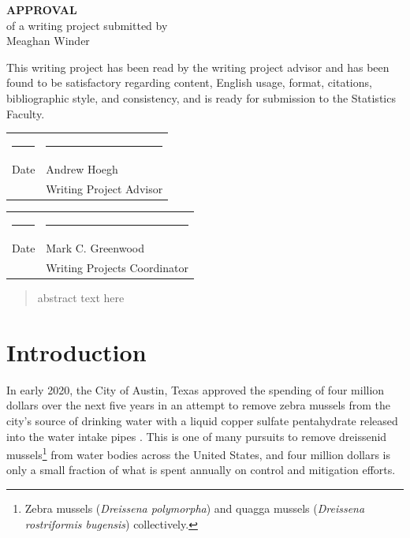 \documentclass[12pt]{article}\usepackage[]{graphicx}\usepackage[]{color}
\begin{document}
\begin{titlepage}
\null
\begin{center}
{\bf\huge APPROVAL}\\[1.0 in]
of a writing project submitted by\\[.25 in]
Meaghan Winder \\[0.5 in]
\end{center}

\noindent
This writing project has been read by the writing project advisor and
has been found to be satisfactory regarding content, English usage,
format, citations, bibliographic style, and consistency, and is ready
for submission to the Statistics Faculty.

\vspace{.3in}
\begin{center}
\begin{tabular}{ll}
\rule{2.75in}{.03in} & \rule{2.75in}{.03in} \\
Date& Andrew Hoegh \\
& Writing Project Advisor \\
\end{tabular}
\end{center}

\vspace{1cm}

\begin{center}
\begin{tabular}{ll}
\rule{2.75in}{.03in} & \rule{2.75in}{.03in} \\
Date& Mark C. Greenwood \\
& Writing Projects Coordinator \\
\end{tabular}
\end{center}

\end{titlepage}

\newpage
\tableofcontents
\newpage

\begin{abstract}
\noindent abstract text here 
\end{abstract}

\doublespacing

\section{Introduction}

In early 2020, the City of Austin, Texas approved the spending of four million dollars over the next five years in an attempt to remove zebra mussels from the city's source of drinking water with a liquid copper sulfate pentahydrate released into the water intake pipes \cite{CBS:Austin}. This is one of many pursuits to remove dreissenid mussels\footnote{Zebra mussels (\textit{Dreissena polymorpha}) and quagga mussels (\textit{Dreissena rostriformis bugensis}) collectively.} from water bodies across the United States, and four million dollars is only a small fraction of what is spent annually on control and mitigation efforts. 
\end{document}
